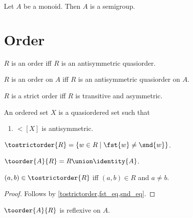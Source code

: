 \begin{corollary}\label{monoid_implies_semigroup}
    Let $A$ be a monoid. Then $A$ is a semigroup.
\end{corollary}\section{Order}

\begin{abbreviation}\label{order}
    $R$ is an order iff
        $R$ is an antisymmetric quasiorder.
\end{abbreviation}

\begin{abbreviation}\label{order_on}
    $R$ is an order on $A$ iff
        $R$ is an antisymmetric quasiorder on $A$.
\end{abbreviation}

\begin{abbreviation}\label{strictorder}
    $R$ is a strict order iff
        $R$ is transitive and asymmetric.
\end{abbreviation}

\begin{struct}\label{orderedset}
    An ordered set $X$ is a quasiordered set
    such that
    \begin{enumerate}
        \item\label{orderedset_antisym} $\lt[X]$ is antisymmetric.
    \end{enumerate}
\end{struct}

\begin{definition}\label{tostrictorder}
    $\tostrictorder{R} = \{w\in R\mid \fst{w}\neq\snd{w}\}$.
\end{definition}

\begin{definition}\label{toorder}
    $\toorder{A}{R} = R\union\identity{A}$.
\end{definition}

\begin{proposition}\label{tostrictorder_iff}
    $(a,b)\in\tostrictorder{R}$ iff $(a,b)\in R$ and $a\neq b$.
\end{proposition}
\begin{proof}
    Follows by \cref{tostrictorder,fst_eq,snd_eq}.
\end{proof}

\begin{proposition}\label{toorder_reflexive}
    $\toorder{A}{R}$ is reflexive on $A$.
\end{proposition}

